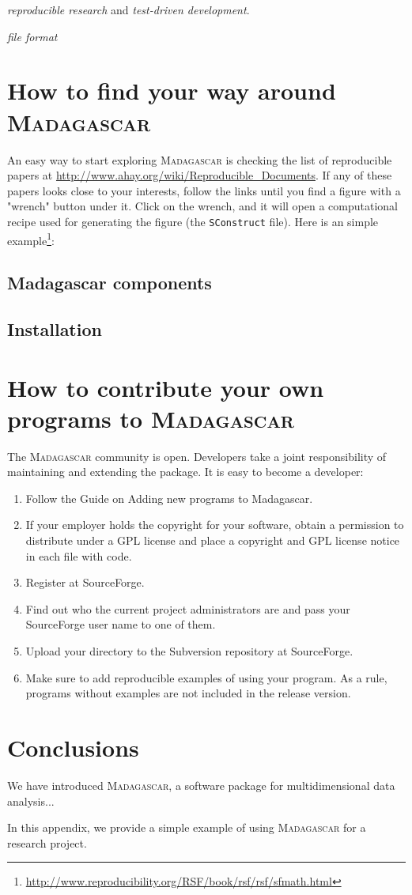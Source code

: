 \emph{reproducible research} and \emph{test-driven development}.

\emph{file format} 

\section{How to find your way around \textsc{Madagascar}}

An easy way to start exploring \textsc{Madagascar} is checking the
list of reproducible papers at
\url{http://www.ahay.org/wiki/Reproducible_Documents}.  If any of
these papers looks close to your interests, follow the links until you
find a figure with a "wrench" button under it. Click on the wrench,
and it will open a computational recipe used for generating the figure
(the \texttt{SConstruct} file). Here is an simple
example\footnote{\url{http://www.reproducibility.org/RSF/book/rsf/rsf/sfmath.html}}:

\subsection{Madagascar components}

\subsection{Installation}

\section{How to contribute your own programs to \textsc{Madagascar}}

The \textsc{Madagascar} community is open. Developers take a joint
responsibility of maintaining and extending the package. It is easy to
become a developer:
\begin{enumerate}
\item  Follow the Guide on Adding new programs to Madagascar.
\item  If your employer holds the copyright for your software, obtain a permission to distribute under a GPL license and place a copyright and GPL license notice in each file with code.
\item Register at SourceForge.
\item Find out who the current project administrators are and pass your SourceForge user name to one of them.
\item Upload your directory to the Subversion repository at SourceForge.
\item Make sure to add reproducible examples of using your program. As a rule, programs without examples are not included in the release version. 
\end{enumerate}	

\section{Conclusions}

We have introduced \textsc{Madagascar}, a software package for multidimensional data analysis...





In this appendix, we provide a simple example of using
\textsc{Madagascar} for a research project.


